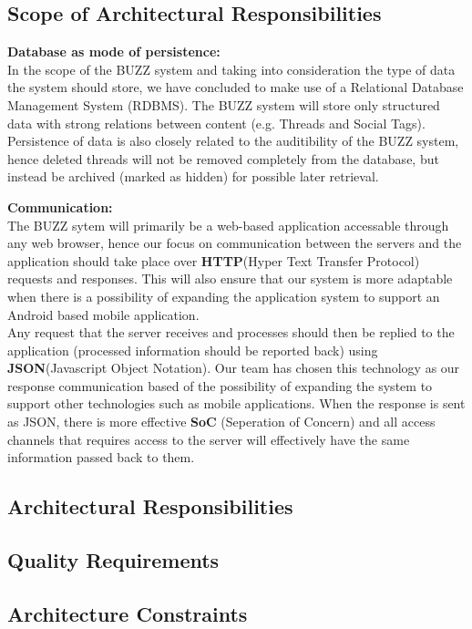 
\subsection{Scope of Architectural Responsibilities}
\begin{flushleft}
	\begin{flushleft}
	\textbf{Database as mode of persistence: } \\
	In the scope of the BUZZ system and taking into consideration the type of data the system should store, we have concluded to make use of a Relational Database Management System (RDBMS). The BUZZ system will store only structured data with strong relations between content (e.g. Threads and Social Tags). Persistence of data is also closely related to the auditibility of the BUZZ system, hence deleted threads will not be removed completely from the database, but instead be archived (marked as hidden) for possible later retrieval.
	\end{flushleft}
	
	\begin{flushleft}
	\textbf{Communication:}\\
	The BUZZ sytem will primarily be a web-based application accessable through any web browser, hence our focus on communication between the servers and the application should take place over \textbf{HTTP}(Hyper Text Transfer Protocol) requests and responses. This will also ensure that our system is more adaptable when there is a possibility of expanding the application system to support an Android based mobile application. \\
	Any request that the server receives and processes should then be replied to the application (processed information should be reported back) using \textbf{JSON}(Javascript Object Notation). Our team has chosen this technology as our response communication based of the possibility of expanding the system to support other technologies such as mobile applications. When the response is sent as JSON, there is more effective \textbf{SoC} (Seperation of Concern) and all access channels that requires access to the server will effectively have the same information passed back to them.
	\end{flushleft}
\end{flushleft}

\subsection{Architectural Responsibilities}
\subsection{Quality Requirements}
	
	
\subsection{Architecture Constraints}